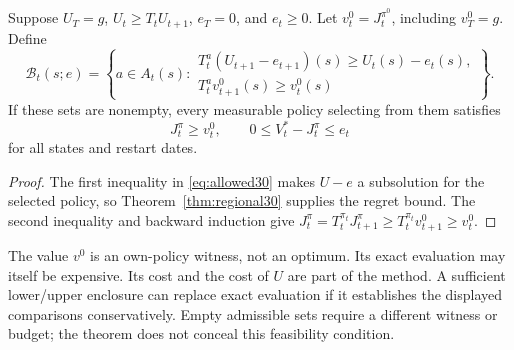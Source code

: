 \begin{proposition}\label{prop:class30}
Suppose $U_T=g$, $U_t\ge T_tU_{t+1}$, $e_T=0$, and $e_t\ge0$. Let $v_t^0=J_t^{\pi^0}$, including $v_T^0=g$. Define
\begin{equation}\label{eq:allowed30}
 \mathcal B_t(s;e)=\left\{a\in A_t(s):
 \begin{array}{l}T_t^a(U_{t+1}-e_{t+1})(s)\ge U_t(s)-e_t(s),\\
 T_t^a v_{t+1}^0(s)\ge v_t^0(s)
 \end{array}\right\}.
\end{equation}
If these sets are nonempty, every measurable policy selecting from them satisfies
\begin{equation}
 J_t^\pi\ge v_t^0,\qquad 0\le V_t^*-J_t^\pi\le e_t
\end{equation}
for all states and restart dates.
\end{proposition}
\begin{proof}
The first inequality in \eqref{eq:allowed30} makes $U-e$ a subsolution for the selected policy, so Theorem~\ref{thm:regional30} supplies the regret bound. The second inequality and backward induction give $J_t^\pi=T_t^{\pi_t}J_{t+1}^\pi\ge T_t^{\pi_t}v_{t+1}^0\ge v_t^0$.\end{proof}
The value $v^0$ is an own-policy witness, not an optimum. Its exact evaluation may itself be expensive. Its cost and the cost of $U$ are part of the method. A sufficient lower/upper enclosure can replace exact evaluation if it establishes the displayed comparisons conservatively. Empty admissible sets require a different witness or budget; the theorem does not conceal this feasibility condition.

